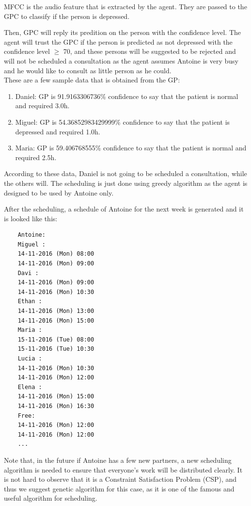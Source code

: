 \documentclass{article}
\begin{document}
	MFCC is the audio feature that is extracted by the agent. They are passed to the GPC to classify if the person is depressed. 

	Then, GPC will reply its predition on the person with the confidence level.
	The agent will trust the GPC if the person is predicted as not depressed with the confidence level \(\geq\) 70,
	and these persons will be suggested to be rejected and will not be scheduled a consultation as the agent assumes Antoine is very busy and 
	he would like to consult as little person as he could.
	\\

	These are a few sample data that is obtained from the GP:
	\begin{enumerate}
     	\item Daniel: GP is 91.9163306736\% confidence to say that the patient is normal and required 3.0h.
		\item Miguel: GP is 54.36852983429999\% confidence to say that the patient is depressed and required 1.0h.
		\item Maria: GP is 59.406768555\% confidence to say that the patient is normal and required 2.5h.
     \end{enumerate}

	According to these data, Daniel is not going to be scheduled a consultation, while the others will.
	The scheduling is just done using greedy algorithm as the agent is designed to be used by Antoine only.

	After the scheduling, a schedule of Antoine for the next week is generated and it is looked like this:
	
	\begin{lrbox}{\myv}\begin{minipage}{0.5\textwidth}
	\begin{verbatim}
	Antoine:
	Miguel : 
	14-11-2016 (Mon) 08:00 
	14-11-2016 (Mon) 09:00
	Davi : 
	14-11-2016 (Mon) 09:00 
	14-11-2016 (Mon) 10:30
	Ethan : 
	14-11-2016 (Mon) 13:00 
	14-11-2016 (Mon) 15:00
	Maria : 
	15-11-2016 (Tue) 08:00 
	15-11-2016 (Tue) 10:30
	Lucia : 
	14-11-2016 (Mon) 10:30 
	14-11-2016 (Mon) 12:00
	Elena : 
	14-11-2016 (Mon) 15:00 
	14-11-2016 (Mon) 16:30
	Free: 
	14-11-2016 (Mon) 12:00 
	14-11-2016 (Mon) 12:00
	...
	\end{verbatim}
	\end{minipage}\end{lrbox}
	\resizebox{0.5\textwidth}{!}{\usebox\myv}
	
	Note that, in the future if Antoine has a few new partners, a new scheduling algorithm is needed to ensure that everyone's work will be distributed clearly.
	It is not hard to observe that it is a Constraint Satisfaction Problem (CSP), and thus we suggest genetic algorithm for this case, 
	as it is one of the famous and useful algorithm for scheduling. \\
\end{document}
